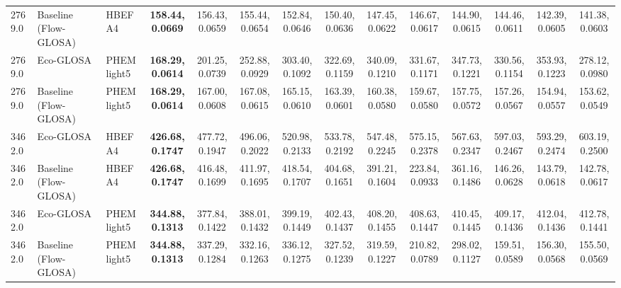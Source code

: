 \begin{table}[htb]
{\begin{tabular}{l l l *{11}{c}}
      2769.0 & Baseline (Flow-GLOSA)     & HBEFA4       & \textbf{158.44,0.0669}   & 156.43,0.0659 & 155.44,0.0654 & 152.84,0.0646 & 150.40,0.0636 & 147.45,0.0622 & 146.67,0.0617 & 144.90,0.0615 & 144.46,0.0611 & 142.39,0.0605 & 141.38,0.0603 \\
      2769.0 & Eco-GLOSA                 & PHEMlight5   & \textbf{168.29,0.0614}   & 201.25,0.0739 & 252.88,0.0929 & 303.40,0.1092 & 322.69,0.1159 & 340.09,0.1210 & 331.67,0.1171 & 347.73,0.1221 & 330.56,0.1154 & 353.93,0.1223 & 278.12,0.0980 \\
      2769.0 & Baseline (Flow-GLOSA)     & PHEMlight5   & \textbf{168.29,0.0614}   & 167.00,0.0608 & 167.08,0.0615 & 165.15,0.0610 & 163.39,0.0601 & 160.38,0.0580 & 159.67,0.0580 & 157.75,0.0572 & 157.26,0.0567 & 154.94,0.0557 & 153.62,0.0549 \\
      \midrule
      3462.0 & Eco-GLOSA                 & HBEFA4       & \textbf{426.68,0.1747}   & 477.72,0.1947 & 496.06,0.2022 & 520.98,0.2133 & 533.78,0.2192 & 547.48,0.2245 & 575.15,0.2378 & 567.63,0.2347 & 597.03,0.2467 & 593.29,0.2474 & 603.19,0.2500 \\
      3462.0 & Baseline (Flow-GLOSA)     & HBEFA4       & \textbf{426.68,0.1747}   & 416.48,0.1699 & 411.97,0.1695 & 418.54,0.1707 & 404.68,0.1651 & 391.21,0.1604 & 223.84,0.0933 & 361.16,0.1486 & 146.26,0.0628 & 143.79,0.0618 & 142.78,0.0617 \\
      3462.0 & Eco-GLOSA                 & PHEMlight5   & \textbf{344.88,0.1313}   & 377.84,0.1422 & 388.01,0.1432 & 399.19,0.1449 & 402.43,0.1437 & 408.20,0.1455 & 408.63,0.1447 & 410.45,0.1445 & 409.17,0.1436 & 412.04,0.1436 & 412.78,0.1441 \\
      3462.0 & Baseline (Flow-GLOSA)     & PHEMlight5   & \textbf{344.88,0.1313}   & 337.29,0.1284 & 332.16,0.1263 & 336.12,0.1275 & 327.52,0.1239 & 319.59,0.1227 & 210.82,0.0789 & 298.02,0.1127 & 159.51,0.0589 & 156.30,0.0568 & 155.50,0.0569 \\
      \bottomrule
    \end{tabular}%
  }
\end{table}
